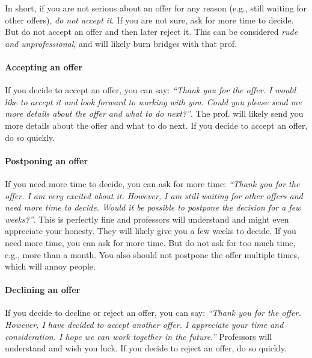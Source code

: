 \documentclass[oneside,11pt]{book}
\begin{document}
In short, if you are not serious about an offer for any reason (e.g., still waiting for other offers), \emph{do not accept it}.
If you are not sure, ask for more time to decide.  But do not accept an offer and then later reject it.  This can be considered \emph{rude and unprofessional}, and will likely burn bridges with that prof.

\paragraph{Accepting an offer} If you decide to accept an offer, you can say: \emph{``Thank you for the offer.  I would like to accept it and look forward to working with you.  Could you please send me more details about the offer and what to do next?''}. The prof. will likely send you more details about the offer and what to do next.  If you decide to accept an offer, do so quickly.


\paragraph{Postponing an offer} If you need more time to decide, you can ask for more time: \emph{``Thank you for the offer.  I am very excited about it.  However, I am still waiting for other offers and need more time to decide.  Would it be possible to postpone the decision for a few weeks?''}.  This is perfectly fine and professors will understand and might even appreciate your honesty.  They will likely give you a few weeks to decide.  If you need more time, you can ask for more time.  But do not ask for too much time, e.g., more than a month.  You also should not postpone the offer multiple times, which will annoy people.

\paragraph{Declining an offer} If you decide to decline or reject an offer, you can say: \emph{``Thank you for the offer. However, I have decided to accept another offer.  I appreciate your time and consideration.  I hope we can work together in the future.''}  Professors will understand and wish you luck.  If you decide to reject an offer, do so quickly.
\end{document}

